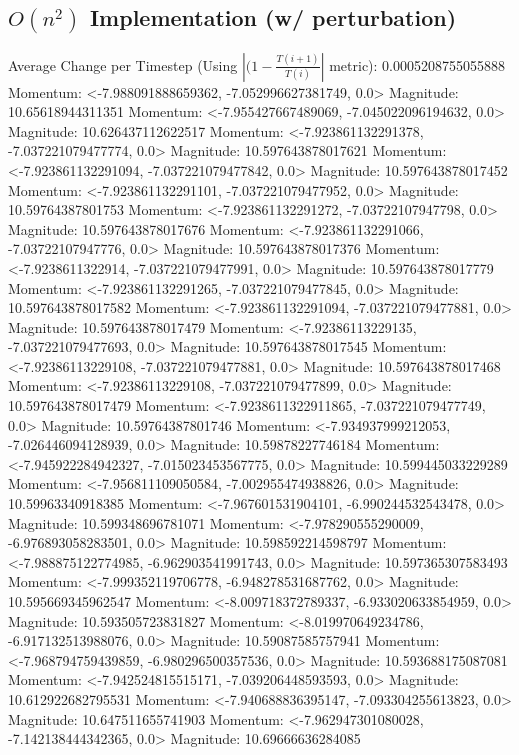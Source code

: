 \documentclass[10pt]{article}
\begin{document}
\subsection{$O(n^2)$ Implementation (w/ perturbation)}
Average Change per Timestep (Using $|(1 - \frac{T(i+1)}{T(i)}|$ metric): 0.0005208755055888
Momentum: <-7.988091888659362, -7.052996627381749, 0.0> Magnitude: 10.65618944311351
Momentum: <-7.955427667489069, -7.045022096194632, 0.0> Magnitude: 10.626437112622517
Momentum: <-7.923861132291378, -7.037221079477774, 0.0> Magnitude: 10.597643878017621
Momentum: <-7.923861132291094, -7.037221079477842, 0.0> Magnitude: 10.597643878017452
Momentum: <-7.923861132291101, -7.037221079477952, 0.0> Magnitude: 10.59764387801753
Momentum: <-7.923861132291272, -7.03722107947798, 0.0> Magnitude: 10.597643878017676
Momentum: <-7.923861132291066, -7.03722107947776, 0.0> Magnitude: 10.597643878017376
Momentum: <-7.9238611322914, -7.037221079477991, 0.0> Magnitude: 10.597643878017779
Momentum: <-7.923861132291265, -7.037221079477845, 0.0> Magnitude: 10.597643878017582
Momentum: <-7.923861132291094, -7.037221079477881, 0.0> Magnitude: 10.597643878017479
Momentum: <-7.92386113229135, -7.037221079477693, 0.0> Magnitude: 10.597643878017545
Momentum: <-7.92386113229108, -7.037221079477881, 0.0> Magnitude: 10.597643878017468
Momentum: <-7.92386113229108, -7.037221079477899, 0.0> Magnitude: 10.597643878017479
Momentum: <-7.9238611322911865, -7.037221079477749, 0.0> Magnitude: 10.59764387801746
Momentum: <-7.934937999212053, -7.026446094128939, 0.0> Magnitude: 10.59878227746184
Momentum: <-7.945922284942327, -7.015023453567775, 0.0> Magnitude: 10.599445033229289
Momentum: <-7.956811109050584, -7.002955474938826, 0.0> Magnitude: 10.59963340918385
Momentum: <-7.967601531904101, -6.990244532543478, 0.0> Magnitude: 10.599348696781071
Momentum: <-7.978290555290009, -6.976893058283501, 0.0> Magnitude: 10.598592214598797
Momentum: <-7.988875122774985, -6.962903541991743, 0.0> Magnitude: 10.597365307583493
Momentum: <-7.999352119706778, -6.948278531687762, 0.0> Magnitude: 10.595669345962547
Momentum: <-8.009718372789337, -6.933020633854959, 0.0> Magnitude: 10.593505723831827
Momentum: <-8.019970649234786, -6.917132513988076, 0.0> Magnitude: 10.59087585757941
Momentum: <-7.968794759439859, -6.980296500357536, 0.0> Magnitude: 10.593688175087081
Momentum: <-7.942524815515171, -7.039206448593593, 0.0> Magnitude: 10.612922682795531
Momentum: <-7.940688836395147, -7.093304255613823, 0.0> Magnitude: 10.647511655741903
Momentum: <-7.962947301080028, -7.142138444342365, 0.0> Magnitude: 10.69666636284085
\end{document}
